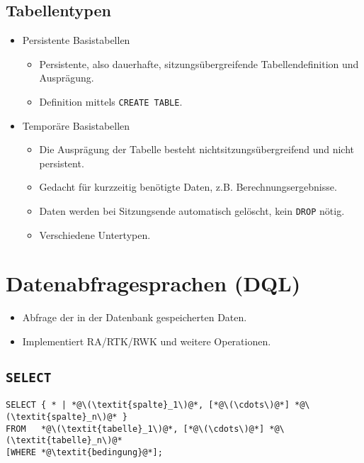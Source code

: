         \subsection{Tabellentypen} %
            \begin{itemize}
            	\item Persistente Basistabellen
            		\begin{itemize}
            			\item Persistente, also dauerhafte, sitzungsübergreifende Tabellendefinition und Ausprägung.
            			\item Definition mittels \lstinline|CREATE TABLE|.
            		\end{itemize}
            	\item Temporäre Basistabellen
            		\begin{itemize}
            			\item Die Ausprägung der Tabelle besteht nichtsitzungsübergreifend und nicht persistent.
            			\item Gedacht für kurzzeitig benötigte Daten, z.B. Berechnungsergebnisse.
            			\item Daten werden bei Sitzungsende automatisch gelöscht, kein \lstinline|DROP| nötig.
            			\item Verschiedene Untertypen.
            		\end{itemize}
            \end{itemize}

    \section{Datenabfragesprachen (DQL)} %
        \begin{itemize}
        	\item Abfrage der in der Datenbank gespeicherten Daten.
        	\item Implementiert RA/RTK/RWK und weitere Operationen.
        \end{itemize}

        \subsection{\lstinline|SELECT|} %
            \begin{lstlisting}
SELECT { * | *@\(\textit{spalte}_1\)@*, [*@\(\cdots\)@*] *@\(\textit{spalte}_n\)@* }
FROM   *@\(\textit{tabelle}_1\)@*, [*@\(\cdots\)@*] *@\(\textit{tabelle}_n\)@*
[WHERE *@\textit{bedingung}@*];
            \end{lstlisting}
            
